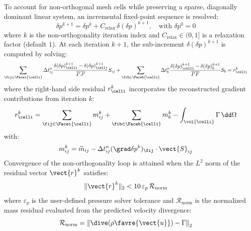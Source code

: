 To account for non-orthogonal mesh cells while preserving a sparse, diagonally
dominant linear system, an incremental fixed-point sequence is resolved:
\begin{equation}
  \delta p^{k+1} = \delta p^k + C_{\text{relax}} \, \delta(\delta p)^{k+1}, \quad \text{with } \delta p^0 = 0
\end{equation}
where $k$ is the non-orthogonality iteration index and $C_{\text{relax}} \in (0, 1]$
is a relaxation factor (default $1$).
At each iteration $k+1$, the sub-increment $\delta(\delta p)^{k+1}$ is computed by
solving:
\begin{equation}
  \sum_{\fij \in \Facei{\celli}} \Delta t_{ij}^n \frac{\delta(\delta p)_\celli^{k+1} - \delta(\delta p)_\cellj^{k+1}}{\overline{I'J'}} S_{ij}
  + \sum_{\fib \in \Faceb{\celli}} \Delta t_{b}^n \frac{\delta(\delta p)_\celli^{k+1} - \delta(\delta p)_{b}^{k+1}}{\overline{I'F}} S_{b}
  = r_\celli^k
  \label{eq:pressure_correction:incremental_linear_sys}
\end{equation}
where the right-hand side residual $r_\celli^k$ incorporates the reconstructed
gradient contributions from iteration $k$:
\begin{equation}
  r_\celli^k = \sum_{\fij \in \Facei{\celli}} m_{ij}^k + \sum_{\fib \in \Faceb{\celli}} m_{b}^k - \int_{\vol{\celli}} \Gamma \, \dd \Omega
\end{equation}
with:
\begin{equation}
  m_{ij}^k = \widetilde{m}_{ij} - \Delta t_{ij}^n (\grad \delta p^k)_{\fij} \cdot \vect{S}_{ij}
\end{equation}
Convergence of the non-orthogonality loop is attained when the $L^2$ norm of the
residual vector $\vect{r}^k$ satisfies:
\begin{equation}
  \| \vect{r}^k \|_2 < 10 \, \varepsilon_p \, \mathcal{R}_{\text{norm}}
\end{equation}
where $\varepsilon_p$ is the user-defined pressure solver tolerance and
$\mathcal{R}_{\text{norm}}$ is the normalized mass residual evaluated from the
predicted velocity divergence:
\begin{equation}
  \mathcal{R}_{\text{norm}} = \left\| \dive(\rho \favre{\vect{u}}) - \Gamma \right\|_2
\end{equation}

